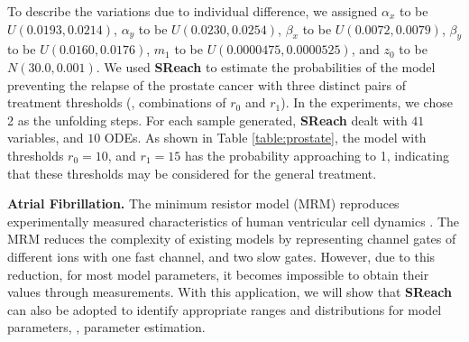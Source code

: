 To describe the variations due to individual difference, we assigned $\alpha_x$ to be $U(0.0193, 0.0214)$, $\alpha_y$ to be $U(0.0230, 0.0254)$, $\beta_x$ to be $U(0.0072, 0.0079)$, $\beta_y$ to be $U(0.0160, 0.0176)$, $m_1$ to be $U(0.0000475, 0.0000525) $, and $z_0$ to be $N(30.0, 0.001)$. 
We used {\bf SReach} to estimate the probabilities of the model preventing the relapse of the prostate cancer with three distinct pairs of treatment thresholds (\ie, combinations of $r_0$ and $r_1$).  In the experiments, we chose 2 as the unfolding steps. For each sample generated, {\bf SReach} dealt with $41$ variables, and $10$ ODEs. As shown in Table \ref{table:prostate}, the model with thresholds $r_0 = 10$, and $r_1 = 15$ has the probability approaching to 1, indicating that these thresholds may be considered for the general treatment. 

{\bf\noindent Atrial Fibrillation.} The minimum resistor model (MRM) reproduces experimentally measured characteristics 
of human ventricular cell dynamics \cite{bueno2008minimal}. 
The MRM reduces the complexity of existing models by representing channel gates of different ions with one fast channel, and two slow gates. However, due to this reduction, for most model parameters, it becomes impossible to obtain their values through measurements. With this application, we will show that {\bf SReach} can also be adopted to identify appropriate ranges and distributions for model parameters, \ie, parameter estimation.

